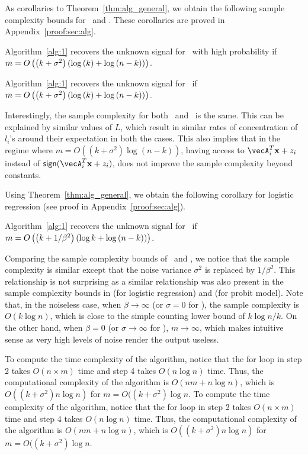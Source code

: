 As corollaries to Theorem~\ref{thm:alg_general}, we obtain the following sample complexity bounds for \bcs\ and \spl. These corollaries are proved in Appendix~\ref{proof:sec:alg}.
\begin{corollary}\label{thm:alg_bcs}
Algorithm~\ref{alg:1} recovers the unknown signal for \bcs\ with high probability if $m=O\left(\left(k+\sigma^2\right)(\log\left(k\right)+\log\left(n-k\right))\right)$.
\end{corollary}
\begin{corollary}\label{thm:alg_spl}
Algorithm~\ref{alg:1} recovers the unknown signal for \spl\ if $m=O\left(\left(k+\sigma^2\right)(\log\left(k\right)+\log\left(n-k\right))\right)$.
\end{corollary}
 Interestingly, the sample complexity for both \bcs\ and \spl\ is the same. This can be explained by similar values of $L$, which result in similar rates of concentration of $l_i$'s around their expectation in both the cases. 
This also implies that in the regime where $m = O((k+\sigma^2)\log(n-k))$, having access to $\vecA_i^T \bx+z_i$ instead of $\sign{\vecA_i^T \bx+z_i}$, does not improve the sample complexity beyond constants.

Using Theorem~\ref{thm:alg_general}, we obtain the following corollary for logistic regression (see proof in Appendix~\ref{proof:sec:alg}).
\begin{corollary}\label{thm:alg_logreg}
Algorithm~\ref{alg:1} recovers the unknown signal for \logreg\ if $m=O\left(\left(k+1/\beta^2\right)\left(\log{k}+\log\left(n-k\right)\right)\right)$.
\end{corollary}
Comparing the sample complexity bounds of \bcs\ and \logreg, we notice that the sample complexity is similar except that   the noise variance $\sigma^2$ is replaced by $1/\beta^2$. This relationship is not surprising as a similar relationship was also present in the sample complexity bounds in \cite{hsu2024sample} (for logistic regression) and \cite{kuchelmeister2024finite} (for probit model). Note that, in the noiseless case, when $\beta\rightarrow \infty$ (or $\sigma = 0$ for \bcs), the sample complexity is $O(k\log{n})$, which is close to the simple counting lower bound of $k\log{n/k}$. On the other hand, when $\beta = 0$ (or $\sigma\rightarrow \infty$ for \bcs), $m\rightarrow \infty$, which makes intuitive sense as very high levels of noise render the output useless.


To compute the time complexity of the algorithm, notice that the for loop in step 2 takes $O(n\times m)$ time and step 4 takes $O(n\log{n})$ time. Thus, the computational complexity of the algorithm is $O(nm+n\log{n})$, which is $O((k+\sigma^2)n\log{n})$ for $m = O((k+\sigma^2)\log{n}$.
To compute the time complexity of the algorithm, notice that the for loop in step 2 takes $O(n\times m)$ time and step 4 takes $O(n\log{n})$ time. Thus, the computational complexity of the algorithm is $O(nm+n\log{n})$, which is $O((k+\sigma^2)n\log{n})$ for $m = O((k+\sigma^2)\log{n}$.



